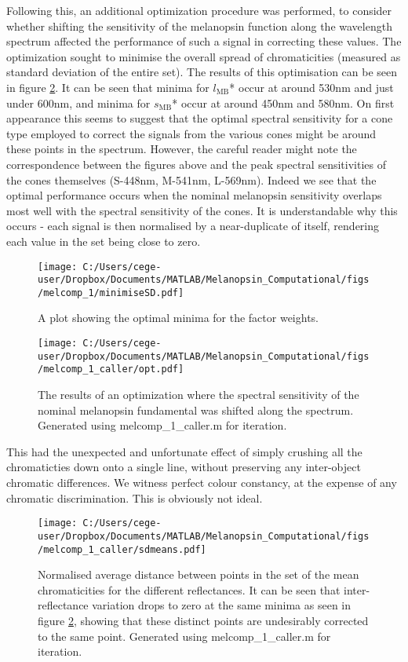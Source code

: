 Following this, an additional optimization procedure was performed, to consider whether shifting the sensitivity of the melanopsin function along the wavelength spectrum affected the performance of such a signal in correcting these values. The optimization sought to minimise the overall spread of chromaticities (measured as standard deviation of the entire set). The results of this optimisation can be seen in figure \ref{fig:opt}. It can be seen that minima for $l_{\text{MB}}$* occur at around 530nm and just under 600nm, and minima for $s_{\text{MB}}$* occur at around 450nm and 580nm. On first appearance this seems to suggest that the optimal spectral sensitivity for a cone type employed to correct the signals from the various cones might be around these points in the spectrum. However, the careful reader might note the correspondence between the figures above and the peak spectral sensitivities of the cones themselves (S-448nm, M-541nm, L-569nm). Indeed we see that the optimal performance occurs when the nominal melanopsin sensitivity overlaps most well with the spectral sensitivity of the cones. It is understandable why this occurs - each signal is then normalised by a near-duplicate of itself, rendering each value in the set being close to zero.

\begin{figure}[h]
    \centering
    \texttt{[image: C:/Users/cege-user/Dropbox/Documents/MATLAB/Melanopsin\_Computational/figs/melcomp\_1/minimiseSD.pdf]}
    \caption{A plot showing the optimal minima for the factor weights.}
    \label{fig:minSD}
\end{figure} 

\begin{figure}[ht]
    \centering
    \texttt{[image: C:/Users/cege-user/Dropbox/Documents/MATLAB/Melanopsin\_Computational/figs/melcomp\_1\_caller/opt.pdf]}
    \caption{The results of an optimization where the spectral sensitivity of the nominal melanopsin fundamental was shifted along the spectrum. Generated using melcomp\_1\_caller.m for iteration.}
    \label{fig:opt}
\end{figure} 

This had the unexpected and unfortunate effect of simply crushing all the chromaticties down onto a single line, without preserving any inter-object chromatic differences. We witness perfect colour constancy, at the expense of any chromatic discrimination. This is obviously not ideal.

\begin{figure}[h]
    \centering
    \texttt{[image: C:/Users/cege-user/Dropbox/Documents/MATLAB/Melanopsin\_Computational/figs/melcomp\_1\_caller/sdmeans.pdf]}
    \caption{Normalised average distance between points in the set of the mean chromaticities for the different reflectances. It can be seen that inter-reflectance variation drops to zero at the same minima as seen in figure \ref{fig:opt}, showing that these distinct points are undesirably corrected to the same point. Generated using melcomp\_1\_caller.m for iteration.}
    \label{fig:sdmeans}
\end{figure} 


